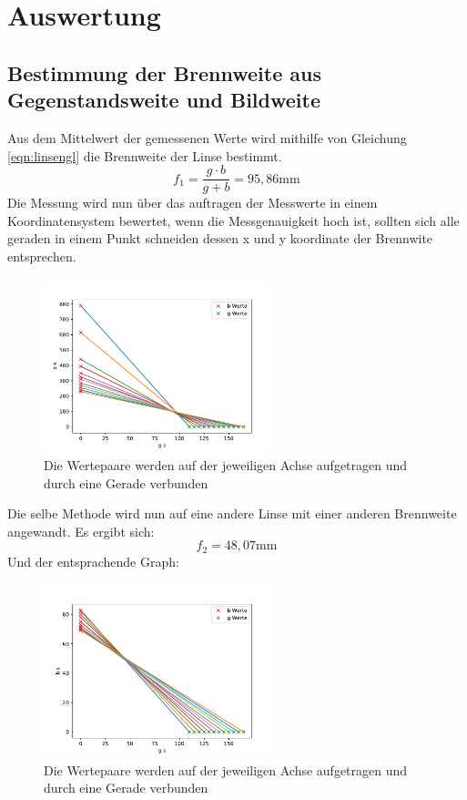 \section{Auswertung}
\label{sec:Auswertung}
\subsection{Bestimmung der Brennweite aus Gegenstandsweite und Bildweite}
Aus dem Mittelwert der gemessenen Werte wird mithilfe von Gleichung \ref{eqn:linsengl} die Brennweite der Linse bestimmt.
\begin{equation}
    f_1 = \frac{g \cdot b}{g+b} = 95,86 \text{mm}
\end{equation}
Die Messung wird nun über das auftragen der Messwerte in einem Koordinatensystem bewertet, wenn die Messgenauigkeit hoch ist, sollten sich alle geraden in einem Punkt schneiden dessen x und y koordinate der Brennwite entsprechen.
\begin{figure}[H]
    \centering
    \includegraphics[width=0.6\textwidth]{plots/plot1.pdf}
    \caption{Die Wertepaare werden auf der jeweiligen Achse aufgetragen und durch eine Gerade verbunden}
\end{figure}
Die selbe Methode wird nun auf eine andere Linse mit einer anderen Brennweite angewandt.
Es ergibt sich:
\begin{equation}
    f_2 = 48,07 \text{mm}
\end{equation}
Und der entsprachende Graph:
\begin{figure}[H]
    \centering
    \includegraphics[width=0.6\textwidth]{plots/plot2.pdf}
    \caption{Die Wertepaare werden auf der jeweiligen Achse aufgetragen und durch eine Gerade verbunden}
\end{figure}


